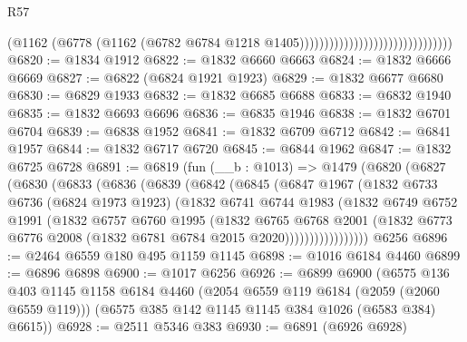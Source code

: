 \begin{lexlean}{R57}
\begin{coremodule}
                                                          (@1162
                                                            (@6778
                                                              (@1162
                                                                (@6782
                                                                  @6784
                                                                  @1218
                                                                  @1405)))))))))))))))))))))))))))))))
@6820 := @1834 @1912
@6822 := @1832 @6660 @6663
@6824 := @1832 @6666 @6669
@6827 := @6822 (@6824 @1921 @1923)
@6829 := @1832 @6677 @6680
@6830 := @6829 @1933
@6832 := @1832 @6685 @6688
@6833 := @6832 @1940
@6835 := @1832 @6693 @6696
@6836 := @6835 @1946
@6838 := @1832 @6701 @6704
@6839 := @6838 @1952
@6841 := @1832 @6709 @6712
@6842 := @6841 @1957
@6844 := @1832 @6717 @6720
@6845 := @6844 @1962
@6847 := @1832 @6725 @6728
@6891 := @6819
    (fun (__b : @1013) =>
    @1479
      (@6820
        (@6827
          (@6830
            (@6833
              (@6836
                (@6839
                  (@6842
                    (@6845
                      (@6847
                        @1967
                        (@1832
                          @6733
                          @6736
                          (@6824 @1973 @1923)
                          (@1832
                            @6741
                            @6744
                            @1983
                            (@1832
                              @6749
                              @6752
                              @1991
                              (@1832
                                @6757
                                @6760
                                @1995
                                (@1832
                                  @6765
                                  @6768
                                  @2001
                                  (@1832
                                    @6773
                                    @6776
                                    @2008
                                    (@1832 @6781 @6784 @2015 @2020)))))))))))))))))
    @6256
@6896 := @2464 @6559 @180 @495 @1159 @1145
@6898 := @1016 @6184 @4460
@6899 := @6896 @6898
@6900 := @1017 @6256
@6926 := @6899
    @6900
    (@6575
      @136
      @403
      @1145
      @1158
      @6184
      @4460
      (@2054 @6559 @119 @6184 (@2059 (@2060 @6559 @119)))
      (@6575 @385 @142 @1145 @1145 @384 @1026 (@6583 @384) @6615))
@6928 := @2511 @5346 @383
@6930 := @6891 (@6926 @6928)

\end{coremodule}
\end{lexlean}
